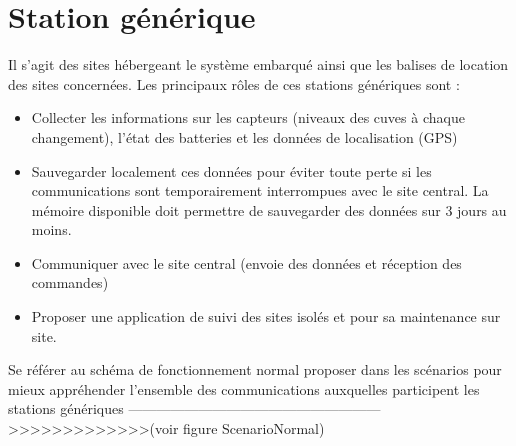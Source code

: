 \section{Station générique}
    Il s'agit des sites hébergeant le système embarqué ainsi que les balises de location des sites concernées. Les principaux rôles de ces stations génériques sont :
\begin{itemize}
       \item Collecter les informations sur les capteurs (niveaux des cuves à chaque changement), l'état des batteries et les données de localisation (GPS)
       \item Sauvegarder localement ces données pour éviter toute perte si les communications sont temporairement interrompues avec le site central. La mémoire disponible doit permettre de sauvegarder des données sur 3 jours au moins.
       \item Communiquer avec le site central (envoie des données et réception des commandes)
       \item Proposer une application de suivi des sites isolés et pour sa maintenance sur site.
\end{itemize}

Se référer au schéma de fonctionnement normal proposer dans les scénarios pour mieux appréhender l'ensemble des communications auxquelles participent les stations génériques ------------------------------------------------------>>>>>>>>>>>>>(voir figure ScenarioNormal)